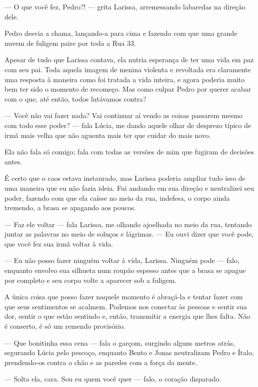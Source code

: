 — O que você fez, Pedro?! — grita Larissa, arremessando labaredas na direção dele.

Pedro desvia a chama, lançando-a para cima e fazendo com que uma grande nuvem de fuligem paire por toda a Rua 33.

Apesar de tudo que Larissa contava, ela nutria esperança de ter uma vida em paz com seu pai. Toda aquela imagem de menina violenta e revoltada era claramente uma resposta à maneira como foi tratada a vida inteira, e agora poderia muito bem ter sido o momento de recomeço. Mas como culpar Pedro por querer acabar com o que, até então, todos lutávamos contra?

\bigskip

— Você não vai fazer nada? Vai continuar aí vendo as coisas passarem mesmo com todo esse poder? — fala Lúcia, me dando aquele olhar de desprezo típico de irmã mais velha que não aguenta mais ter que cuidar do mais novo.

Ela não fala só comigo; fala com todas as versões de mim que fugiram de decisões antes.

É certo que o caos estava instaurado, mas Larissa poderia ampliar tudo isso de uma maneira que eu não fazia ideia. Fui andando em sua direção e neutralizei seu poder, fazendo com que ela caísse no meio da rua, indefesa, o corpo ainda tremendo, a brasa se apagando aos poucos.

— Faz ele voltar — fala Larissa, me olhando ajoelhada no meio da rua, tentando juntar as palavras no meio de soluços e lágrimas. — Eu ouvi dizer que você pode, que você fez sua irmã voltar à vida.

— Eu não posso fazer ninguém voltar à vida, Larissa. Ninguém pode — falo, enquanto envolvo sua silhueta num roupão espesso antes que a brasa se apague por completo e seu corpo volte a aparecer sob a fuligem.

A única coisa que posso fazer naquele momento é abraçá-la e tentar fazer com que seus sentimentos se acalmem. Podemos nos conectar às pessoas e sentir sua dor, sentir o que estão sentindo e, então, transmitir a energia que lhes falta. Não é conserto, é só um remendo provisório.

\bigskip

— Que bonitinha essa cena — fala o garçom, surgindo alguns metros atrás, segurando Lúcia pelo pescoço, enquanto Bento e Jonas neutralizam Pedro e Ítalo, prendendo-os contra o chão e as paredes com a força da mente.

— Solta ela, cara. Sou eu quem você quer — falo, o coração disparado.

